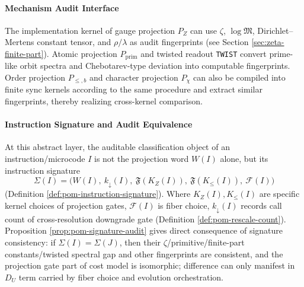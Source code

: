 \paragraph{Mechanism Audit Interface}
The implementation kernel of gauge projection $P_Z$ can use $\zeta$, $\log\mathfrak{M}$, Dirichlet--Mertens constant tensor, and $\rho/\lambda$ as audit fingerprints (see Section \ref{sec:zeta-finite-part}). Atomic projection $P_{\mathrm{prim}}$ and twisted readout \texttt{TWIST} convert prime-like orbit spectra and Chebotarev-type deviation into computable fingerprints. Order projection $P_{\le,b}$ and character projection $P_\chi$ can also be compiled into finite sync kernels according to the same procedure and extract similar fingerprints, thereby realizing cross-kernel comparison.

\paragraph{Instruction Signature and Audit Equivalence}
At this abstract layer, the auditable classification object of an instruction/microcode $I$ is not the projection word $W(I)$ alone, but its instruction signature
$$
\Sigma(I)=\bigl(W(I),\ k_{\downarrow}(I),\ \mathfrak{F}(K_Z(I)),\ \mathfrak{F}(K_{\le}(I)),\ \mathcal{F}(I)\bigr)
$$
(Definition \ref{def:pom-instruction-signature}). Where $K_Z(I),K_{\le}(I)$ are specific kernel choices of projection gates, $\mathcal{F}(I)$ is fiber choice, $k_{\downarrow}(I)$ records call count of cross-resolution downgrade gate (Definition \ref{def:pom-rescale-count}). Proposition \ref{prop:pom-signature-audit} gives direct consequence of signature consistency: if $\Sigma(I)=\Sigma(J)$, then their $\zeta$/primitive/finite-part constants/twisted spectral gap and other fingerprints are consistent, and the projection gate part of cost model is isomorphic; difference can only manifest in $D_U$ term carried by fiber choice and evolution orchestration.

